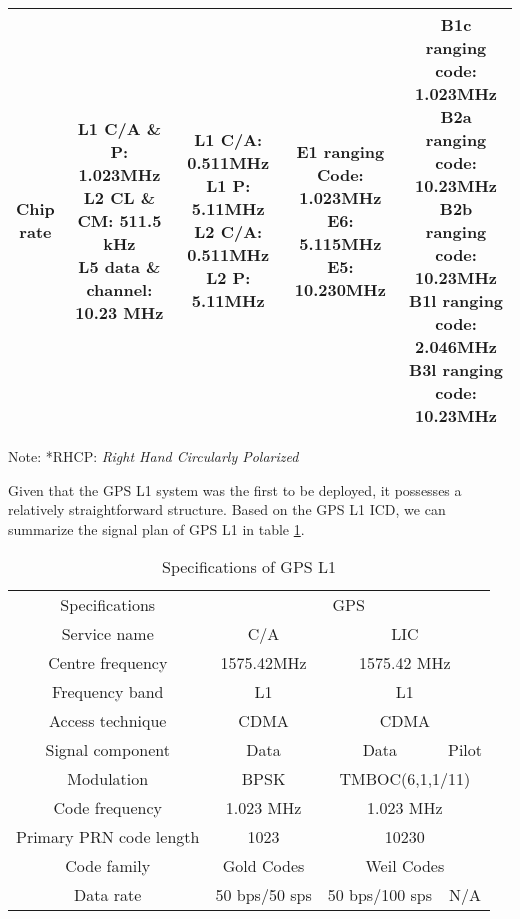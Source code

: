 \begin{landscape}
\begin{center}
\begin{table}
\begin{tabular}{ccccc}
    \thead{Chip\\rate} & \thead{L1 C/A \& P: 1.023MHz\\L2 CL \& CM: 511.5 kHz\\L5 data \& channel: 10.23 MHz} & \thead{L1 C/A: 0.511MHz\\L1 P: 5.11MHz\\L2 C/A: 0.511MHz\\L2 P: 5.11MHz} & \thead{E1 ranging Code: 1.023MHz\\E6: 5.115MHz\\E5: 10.230MHz} & \thead{B1c ranging code: 1.023MHz\\B2a ranging code: 10.23MHz\\B2b ranging code: 10.23MHz\\B1l ranging code: 2.046MHz\\B3l ranging code: 10.23MHz}\\
    \bottomrule
    \end{tabular}
    \footnotesize Note: *RHCP: \textit{Right Hand Circularly Polarized}
\end{table}
\end{center}
\end{landscape}
Given that the GPS L1 system was the first to be deployed\cite{RN184}, it possesses a relatively straightforward structure. Based on the GPS L1 ICD\cite{RN170}, we can summarize the signal plan of GPS L1 in table \ref{tab:spec_gpsl1}.

\begin{table}[!htbp]
\centering
\caption{Specifications of GPS L1}\label{tab:spec_gpsl1}
\renewcommand\arraystretch{1.5}
\begin{tabular}{c@{\hspace{1.3cm}}c@{\hspace{1.3cm}}cc}
    \toprule
    Specifications & \multicolumn{3}{c}{GPS} \\
    Service name & C/A & \multicolumn{2}{c}{LIC} \\
    \midrule
    Centre frequency & 1575.42MHz & \multicolumn{2}{c}{1575.42 MHz} \\
    Frequency band & L1 & \multicolumn{2}{c}{L1} \\
    Access technique & CDMA & \multicolumn{2}{c}{CDMA} \\
    Signal component & Data & Data & Pilot \\
    Modulation & BPSK & \multicolumn{2}{c}{TMBOC(6,1,1/11)} \\
    Code frequency & 1.023 MHz & \multicolumn{2}{c}{1.023 MHz} \\
    Primary PRN code length & 1023 & \multicolumn{2}{c}{10230} \\
    Code family & Gold Codes & \multicolumn{2}{c}{Weil Codes} \\
    Data rate & 50 bps/50 sps & 50 bps/100 sps & N/A \\
    \bottomrule
\end{tabular}
\end{table}

